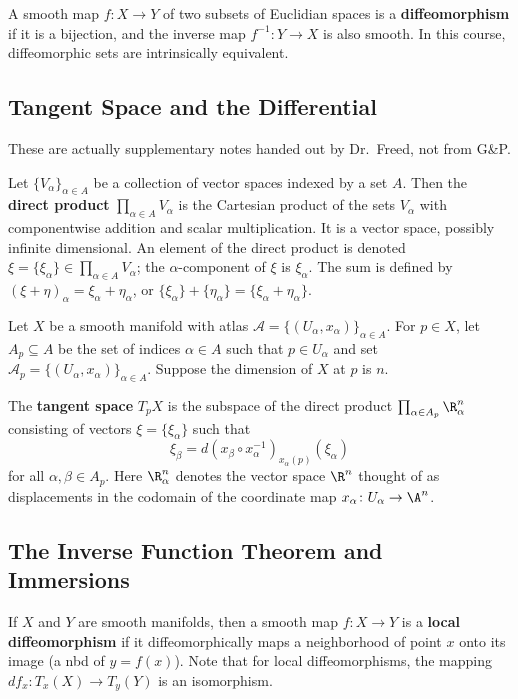 A smooth map $f \colon X \to Y$ of two subsets of Euclidian spaces is a \textbf{diffeomorphism} if it is a bijection, and the inverse map $f ^{-1} \colon Y \to X$ is also smooth. In this course, diffeomorphic sets are intrinsically equivalent.

\orbreak
\subsection{Tangent Space and the Differential}
These are actually supplementary notes handed out by Dr.\ Freed, not from G\&P.
\begin{definition}
    Let $\{V_{\alpha }\} _{\alpha \in A}$ be a collection of vector spaces indexed by a set $A$. Then the \textbf{direct product} $\prod _{\alpha \in A}V_{\alpha }$ is the Cartesian product of the sets $V_{\alpha }$ with componentwise addition and scalar multiplication. It is a vector space, possibly infinite dimensional. An element of the direct product is denoted $\xi = \{\xi _{\alpha }\} \in  \prod _{\alpha \in A}V_{\alpha }$; the $\alpha $-component of $\xi $ is $\xi _{\alpha }$. The sum is defined by $(\xi + \eta)_{\alpha }=\xi _{\alpha }+\eta _{\alpha }$, or $\{\xi _{\alpha }\} +\{\eta _{\alpha }\} = \{\xi_{\alpha }+\eta _{\alpha }\} $.
\end{definition}
Let $X$ be a smooth manifold with atlas $\mathcal{A} = \{(U_{\alpha },x_{\alpha })\} _{\alpha \in A} $. For $p \in X$, let $A_p\subseteq A$ be the set of indices $\alpha \in A$ such that $p \in U_{\alpha }$ and set $\mathcal{A} _p= \{( U_{\alpha },x _{\alpha })\} _{\alpha \in A}$. Suppose the dimension of $X$ at $p$ is $n$.
\begin{definition}
    The \textbf{tangent space} $T_p X$ is the subspace of the direct product $\prod _{\alpha \in  A_p}\R^n  _{\alpha }$ consisting of vectors $\xi = \{\xi _{\alpha }\} $ such that \[
        \xi _{\beta }= d (x _{\beta }\circ x _{\alpha }^{-1}) _{x _{\alpha }(p)}(\xi _{\alpha })
    \] for all $\alpha ,\beta \in  A_p$. Here $\R^n  _{\alpha }$ denotes the vector space $\R^n $ thought of as displacements in the codomain of the coordinate map $x _{\alpha }\colon  U_{\alpha } \to \A^n $.
\end{definition}

\subsection{The Inverse Function Theorem and Immersions}
If $X$ and $Y$ are smooth manifolds, then a smooth map $f \colon X \to Y$ is a \textbf{local diffeomorphism} if it diffeomorphically maps a neighborhood of point $x$ onto its image (a nbd of $y=f(x)$). Note that for local diffeomorphisms, the mapping $df_x \colon T_x(X) \to T_y(Y)$ is an isomorphism.

